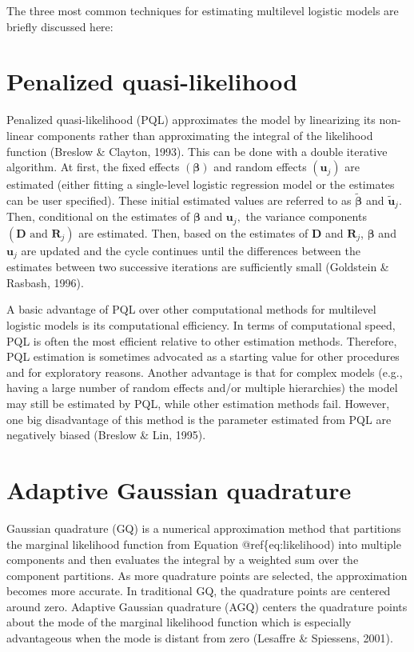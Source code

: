 \documentclass[12pt,oneside,a4paper]{reedthesis}
\begin{document}
The three most common techniques for estimating multilevel logistic models are briefly discussed here:

\hypertarget{penalized-quasi-likelihood}{%
\section{Penalized quasi-likelihood}\label{penalized-quasi-likelihood}}

Penalized quasi-likelihood (PQL) approximates the model by linearizing its non-linear components rather than approximating the integral of the likelihood function (Breslow \& Clayton, 1993). This can be done with a double iterative algorithm.
At first, the fixed effects \((\boldsymbol{\beta})\) and random effects \(\left(\mathbf{u}_{j}\right)\) are estimated (either fitting a single-level logistic regression model or the estimates can be user specified). These initial estimated values are referred to as \(\tilde{\boldsymbol{\beta}}\) and \(\tilde{\mathbf{u}}_{j}\). Then, conditional on the estimates of \(\boldsymbol{\beta}\) and \(\mathbf{u}_{j},\) the variance components \(\left(\mathbf{D} \text { and } \mathbf{R}_{j}\right)\) are estimated. Then, based on the estimates of \(\mathbf{D}\) and \(\mathbf{R}_{j}\), \(\boldsymbol{\beta}\) and \(\mathbf{u}_{j}\) are updated and the cycle continues until the differences between the estimates between two successive iterations are sufficiently small (Goldstein \& Rasbash, 1996).

A basic advantage of PQL over other computational methods for multilevel logistic models is its computational efficiency. In terms of computational speed, PQL is often the most efficient relative to other estimation methods. Therefore, PQL estimation is sometimes advocated as a starting value for other procedures and for exploratory reasons. Another advantage is that for complex models (e.g., having a large number of random effects and/or multiple hierarchies) the model may still be estimated by PQL, while other estimation methods fail. However, one big disadvantage of this method is the parameter estimated from PQL are negatively biased (Breslow \& Lin, 1995).

\hypertarget{adaptive-gaussian-quadrature}{%
\section{Adaptive Gaussian quadrature}\label{adaptive-gaussian-quadrature}}

Gaussian quadrature (GQ) is a numerical approximation method that partitions the marginal likelihood function from Equation @ref\{eq:likelihood) into multiple components and then evaluates the integral by a weighted sum over the component partitions. As more quadrature points are selected, the approximation becomes more accurate. In traditional GQ, the quadrature points are centered around zero. Adaptive Gaussian quadrature (AGQ) centers the quadrature points about the mode of the marginal likelihood function which is especially advantageous when the mode is distant from zero (Lesaffre \& Spiessens, 2001).
\end{document}
